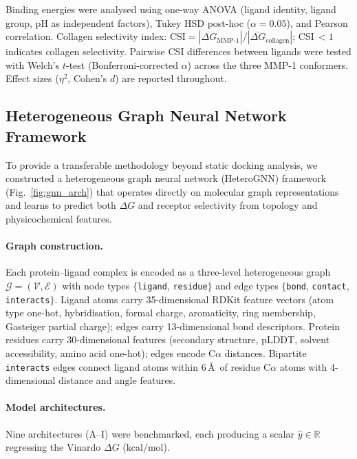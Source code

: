 \documentclass[11pt]{article}
\begin{document}
Binding energies were analysed using one-way ANOVA (ligand identity, ligand
group, pH as independent factors), Tukey HSD post-hoc ($\alpha = 0.05$),
and Pearson correlation.  Collagen selectivity index:
$\mathrm{CSI} = |\overline{\Delta G}_{\mathrm{MMP\text{-}1}}| /
|\overline{\Delta G}_{\mathrm{collagen}}|$;
CSI\,$< 1$ indicates collagen selectivity.  Pairwise CSI differences between
ligands were tested with Welch's $t$-test (Bonferroni-corrected $\alpha$)
across the three MMP-1 conformers.
Effect sizes ($\eta^{2}$, Cohen's $d$) are reported throughout.

\subsection{Heterogeneous Graph Neural Network Framework}
\label{sec:gnn}


To provide a transferable methodology beyond static
docking analysis, we constructed a heterogeneous graph neural network
(HeteroGNN) framework (Fig.~\ref{fig:gnn_arch}) that operates directly on
molecular graph representations and learns to predict both $\Delta G$ and
receptor selectivity from topology and physicochemical features.

\paragraph{Graph construction.}
Each protein--ligand complex is encoded as a three-level heterogeneous graph
$\mathcal{G} = (\mathcal{V}, \mathcal{E})$ with node types
$\{$\texttt{ligand}, \texttt{residue}$\}$ and edge types
$\{$\texttt{bond}, \texttt{contact}, \texttt{interacts}$\}$.
Ligand atoms carry 35-dimensional RDKit feature vectors
(atom type one-hot, hybridisation, formal charge, aromaticity, ring
membership, Gasteiger partial charge); edges carry 13-dimensional bond
descriptors.
Protein residues carry 30-dimensional features (secondary structure, pLDDT,
solvent accessibility, amino acid one-hot); edges encode C$\alpha$ distances.
Bipartite \texttt{interacts} edges connect ligand atoms within 6\,\AA\ of
residue C$\alpha$ atoms with 4-dimensional distance and angle features.

\paragraph{Model architectures.}
Nine architectures (A--I) were benchmarked, each producing a scalar
$\hat{y} \in \mathbb{R}$ regressing the Vinardo $\Delta G$ (kcal/mol).
\end{document}
